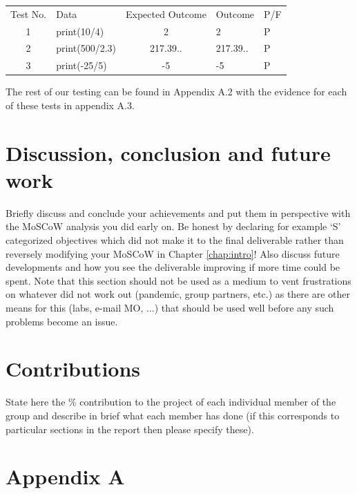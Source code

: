 \documentclass[a4paper, oneside, 11pt]{report}
\begin{document}
\begin{table}
\begin{tabular}{clcll}
\multicolumn{1}{l}{Test No.} & Data            & \multicolumn{1}{l}{Expected Outcome}  & Outcome & P/F \\
1                            & print(10/4)      & 2                                    &  2       & P    \\
2                            & print(500/2.3)   & 217.39..                                   &  217.39..       &    P \\
3                            & print(-25/5)    & -5                                   &     -5    &   P  \\ \hline
\end{tabular}
\end{table}

The rest of our testing can be found in Appendix A.2 with the evidence for each of these tests in appendix A.3.

\chapter{Discussion, conclusion and future work}

Briefly discuss and conclude your achievements and put them in perspective with the MoSCoW analysis you did early on. Be honest by declaring for example `S' categorized objectives which did not make it to the final deliverable rather than reversely modifying your MoSCoW in Chapter \ref{chap:intro}! Also discuss future developments and how you see the deliverable improving if more time could be spent. Note that this section should not be used as a medium to vent frustrations on whatever did not work out (pandemic, group partners, etc.) as there are other means for this (labs, e-mail MO, ...) that should be used well before any such problems become an issue.





\chapter*{Contributions}

State here the \% contribution to the project of each individual member of the group and describe in brief what each member has done (if this corresponds to particular sections in the report then please specify these).

\chapter*{Appendix A}
\end{document}
